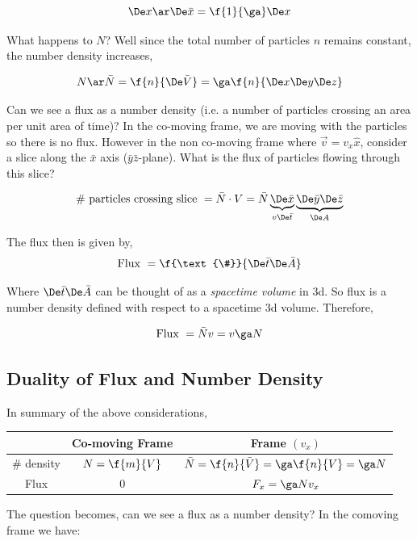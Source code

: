 \documentclass{article}
\begin{document}
\[ \De x \ar \De \bar{x} = \f{1}{\ga} \De x \]

What happens to $N$? Well since the total number of particles $n$ remains constant, the number density increases,

\[ N \ar \bar{N} = \f{n}{\De \bar{V}} = \ga \f{n}{\De x\De y\De z} \]

Can we see a flux as a number density (i.e. a number of particles crossing an area per unit area of time)? In the co-moving frame, we are moving with the particles so there is no flux. However in the non co-moving frame where $\vec{v} = v_x \hat{x}$, consider a slice along the $\bar{x}$ axis ($\bar{y}\bar{z}$-plane). What is the flux of particles flowing through this slice?

\[ \text{\# particles crossing slice } = \bar{N} \cdot V = \bar{N} \underbrace{\De \bar{x}}_{v\De \bar{t}} \underbrace{\De \bar{y} \De \bar{z}}_{\De A} \]

The flux then is given by,
\[ \text{Flux } = \f{\text{\#}}{\De \bar{t} \De \bar{A}} \]

Where $\De \bar{t} \De \bar{A}$ can be thought of as a \textit{spacetime volume} in 3d. So flux is a number density defined with respect to a spacetime 3d volume. Therefore,

\[ \text{Flux } = \bar{N} v = v \ga N \]

\subsection{Duality of Flux and Number Density}

In summary of the above considerations,

\begin{center}
\begin{tabular}{|c|c|c|}
    \hline
    & Co-moving Frame & Frame $(v_x)$ \\
    \hline
    \# density & $N = \f{m}{V}$ & $\bar{N} = \f{n}{\bar{V}}= \ga \f{n}{V} = \ga N$ \\
    \hline
    Flux & $0$ & $F_x = \ga N v_x$ \\
    \hline
\end{tabular}
\end{center}

The question becomes, can we see a flux as a number density? In the comoving frame we have:
\end{document}
